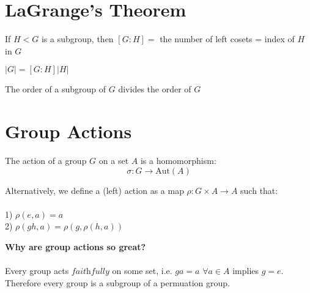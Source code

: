 \documentclass{amsart}
\begin{document}
\section{\textbf{LaGrange's Theorem}}
\hfill
\begin{definition}
    If $H < G$ is a subgroup, then $[G:H]=$ the number of left cosets = index of $H$ in $G$
\end{definition}

\begin{theorem}[LaGrange]
    $|G|=[G:H]|H|$
\end{theorem}
\begin{corollary}
    The order of a subgroup of $G$ divides the order of $G$
\end{corollary}
\hfill
\section{\textbf{Group Actions}}

The action of a group $G$ on a set $A$ is a homomorphism:
$$
\sigma:G\to\text{Aut}(A)
$$
\begin{definition}
    Alternatively, we define a (left) action as a map $\rho:G\times A\to A$ such that:\\
    \\
    1) $\rho(e,a)=a$\\
    2) $\rho(gh,a)=\rho(g,\rho(h,a))$
\end{definition}


\textbf{Why are group actions so great?}\\
\\
Every group acts $\textit{faithfully}$ on some set, i.e. $ga=a$ $\forall a\in A$ implies $g=e$. Therefore every group is a subgroup of a permuation group.
\end{document}
